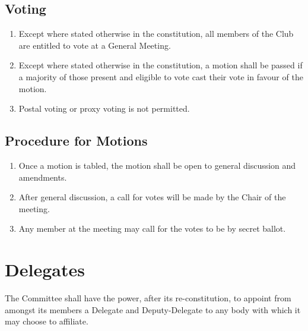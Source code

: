 \documentclass[11pt]{article} %
\begin{document}
\subsection{Voting}
\begin{enumerate}
	\item Except where stated otherwise in the constitution, all members of the Club are entitled to vote at a General Meeting.
	\item Except where stated otherwise in the constitution, a motion shall be passed if a majority of those present and eligible to vote cast their vote in favour of the motion.
	\item Postal voting or proxy voting is not permitted.
\end{enumerate}

\subsection{Procedure for Motions}
\begin{enumerate}
	\item Once a motion is tabled, the motion shall be open to general discussion and amendments.
	\item After general discussion, a call for votes will be made by the Chair of the meeting.
	\item Any member at the meeting may call for the votes to be by secret ballot.
\end{enumerate}

\section{Delegates}
The Committee shall have the power, after its re-constitution, to appoint from amongst its members a Delegate and Deputy-Delegate to any body with which it may choose to affiliate.
\end{document}
